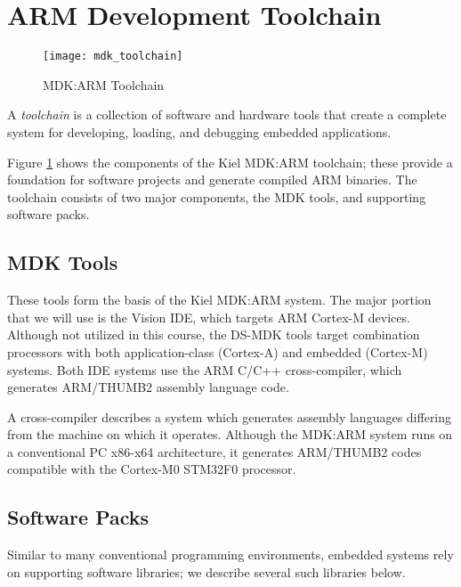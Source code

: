 \documentclass[openany,11pt,fleqn]{book} %
\begin{document}
\section{\color{orange}ARM Development Toolchain}

\begin{figure}[b!]
	\centering\texttt{[image: mdk\_toolchain]}
	\caption{MDK:ARM Toolchain}
	\label{mdk_toolchain}
\end{figure}

A \textit{toolchain} is a collection of software and hardware tools that create a complete system for developing, loading, and debugging embedded applications. 

Figure \ref{mdk_toolchain} shows the components of the Kiel MDK:ARM toolchain; these provide a foundation for software projects and generate compiled ARM binaries. 
The toolchain consists of two major components, the MDK tools, and supporting software packs.

\subsection*{MDK Tools}
These tools form the basis of the Kiel MDK:ARM system. The major portion that we will use is the {\textmu}Vision IDE, which targets ARM Cortex-M devices. Although not utilized in this course, the DS-MDK tools target combination processors with both application-class (Cortex-A) and embedded (Cortex-M) systems. Both IDE systems use the ARM C/C++ cross-compiler, which generates ARM/THUMB2 assembly language code.

A cross-compiler describes a system which generates assembly languages differing from the machine on which it operates. Although the MDK:ARM system runs on a conventional PC x86-x64 architecture, it generates ARM/THUMB2 codes compatible with the Cortex-M0 STM32F0 processor.

\subsection*{Software Packs}
Similar to many conventional programming environments, embedded systems rely on supporting software libraries; we describe several such libraries below.
\end{document}
